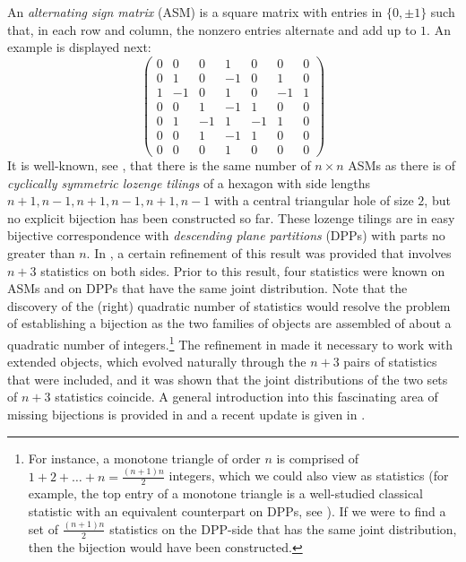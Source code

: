\documentclass[12pt]{amsart}
\theoremstyle{definition}
\numberwithin{equation}{section}
\begin{document}
An \emph{alternating sign matrix} (ASM) is a square matrix with entries in $\{0,\pm 1\}$ such that, in each row and column, the nonzero entries alternate and add up to $1$. An example is displayed next:
\[
\begin{pmatrix}
0 & 0 & 0 & 1 & 0 & 0 & 0 \\
0 & 1 & 0 &-1 & 0 & 1 & 0 \\
1 & -1& 0 & 1 & 0 &-1 & 1 \\
0 & 0 & 1 &-1 & 1 & 0 & 0 \\
0 & 1 & -1& 1&-1 & 1 & 0 \\
0 & 0 & 1 &-1& 1 & 0 & 0 \\
0 & 0 & 0 & 1 & 0 & 0 & 0
 \end{pmatrix} 
\]
It is well-known, see 
\cite{And79,Zei96a,Kra06}, that there is the same number of $n \times n$ ASMs as there is of \emph{cyclically symmetric lozenge tilings} of a hexagon with side lengths $n+1,n-1,n+1,n-1,n+1,n-1$ with a central triangular hole of size $2$, but no explicit bijection has been constructed so far. These lozenge tilings are in easy bijective correspondence with 
\emph{descending plane partitions} (DPPs) with parts no greater than $n$. 
In \cite{nASMDPP}, a certain refinement of this result was provided that involves $n+3$ statistics on both sides. 
Prior to this result, four statistics were known on ASMs and on DPPs that have the same joint distribution. 
Note that the discovery of the (right) quadratic number of statistics  would resolve the problem of establishing a bijection as the two families of objects are assembled of about a quadratic number  of integers.\footnote{For instance, a monotone triangle of order $n$ is comprised of $1+2+\ldots+n=\frac{(n+1)n}{2}$ integers, which we could also view as statistics (for example, the top entry of a monotone triangle is a well-studied classical statistic with an equivalent counterpart on DPPs, see \cite{MilRobRum83,BehDifZin12}). 
If we were to find a set of $\frac{(n+1)n}{2}$ statistics on the DPP-side that has the same joint distribution, then the bijection would have been constructed.}
The  refinement in \cite{nASMDPP}
made it necessary to work with extended objects, which evolved naturally through the $n+3$ pairs of statistics that were included, and it was shown that the joint distributions of the two sets of $n+3$ statistics coincide. A general introduction into this fascinating area of missing bijections is provided in \cite{Bre99} and a recent update is given in \cite{cube}. 
\end{document}
